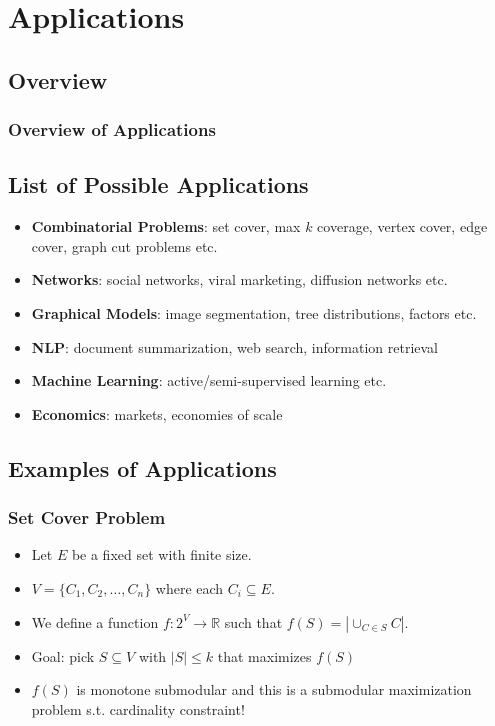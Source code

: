 \documentclass{beamer}
\newcommand{\bbR}{\mathbb{R}}
\begin{document}
\section{Applications}
\subsection{Overview}
\begin{frame}
\frametitle{Overview of Applications}
\subsection{List of Possible Applications}
\begin{itemize}
\item \textbf{Combinatorial Problems}: set cover, max $k$ coverage, vertex cover, edge cover, graph cut problems etc.
\item \textbf{Networks}: social networks, viral marketing, diffusion networks etc.
\item \textbf{Graphical Models}: image segmentation, tree distributions, factors etc.
\item \textbf{NLP}: document summarization, web search, information retrieval
\item \textbf{Machine Learning}: active/semi-supervised learning etc.
\item \textbf{Economics}: markets, economies of scale
\end{itemize}

\end{frame}

\subsection{Examples of Applications}
\begin{frame}
\frametitle{Set Cover Problem}
\begin{itemize}
\item Let $E$ be a fixed set with finite size.
\item $V = \{C_1, C_2, \ldots, C_n\}$ where each $C_i \subseteq E$.
\item  We define a function $f:2^V \rightarrow \bbR$ such that $f(S) = |\cup_{C\in S} C|$.
\item Goal: pick $S \subseteq V$ with $|S| \leq k$ that maximizes $f(S)$
\item $f(S)$ is monotone submodular and this is a submodular maximization problem s.t. cardinality constraint!
\end{itemize}

\end{frame}
\end{document}
